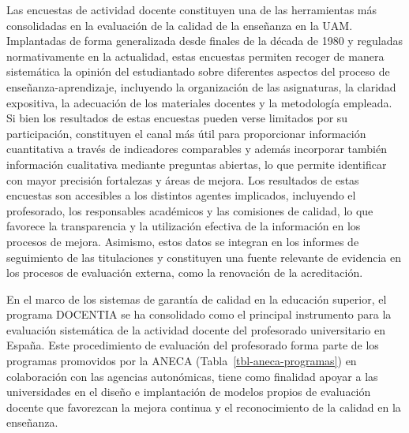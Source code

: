 \documentclass[
  11pt,
  a4paper,
  twoside]{scrreprt}
\begin{document}
Las encuestas de actividad docente constituyen una de las herramientas
más consolidadas en la evaluación de la calidad de la enseñanza en la
UAM. Implantadas de forma generalizada desde finales de la década de
1980 y reguladas normativamente en la actualidad, estas encuestas
permiten recoger de manera sistemática la opinión del estudiantado sobre
diferentes aspectos del proceso de enseñanza-aprendizaje, incluyendo la
organización de las asignaturas, la claridad expositiva, la adecuación
de los materiales docentes y la metodología empleada. Si bien los
resultados de estas encuestas pueden verse limitados por su
participación, constituyen el canal más útil para proporcionar
información cuantitativa a través de indicadores comparables y además
incorporar también información cualitativa mediante preguntas abiertas,
lo que permite identificar con mayor precisión fortalezas y áreas de
mejora. Los resultados de estas encuestas son accesibles a los distintos
agentes implicados, incluyendo el profesorado, los responsables
académicos y las comisiones de calidad, lo que favorece la transparencia
y la utilización efectiva de la información en los procesos de mejora.
Asimismo, estos datos se integran en los informes de seguimiento de las
titulaciones y constituyen una fuente relevante de evidencia en los
procesos de evaluación externa, como la renovación de la acreditación.

En el marco de los sistemas de garantía de calidad en la educación
superior, el programa DOCENTIA se ha consolidado como el principal
instrumento para la evaluación sistemática de la actividad docente del
profesorado universitario en España. Este procedimiento de evaluación
del profesorado forma parte de los programas promovidos por la ANECA
(Tabla~\ref{tbl-aneca-programas}) en colaboración con las agencias
autonómicas, tiene como finalidad apoyar a las universidades en el
diseño e implantación de modelos propios de evaluación docente que
favorezcan la mejora continua y el reconocimiento de la calidad en la
enseñanza.
\end{document}
